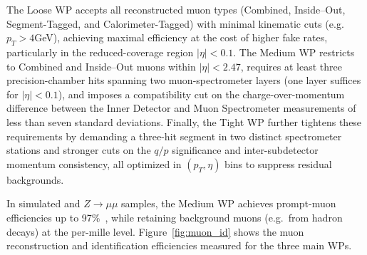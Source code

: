 The Loose WP accepts all reconstructed muon types (Combined, Inside–Out, Segment-Tagged, and Calorimeter-Tagged) with minimal kinematic cuts (e.g.\ $p_T>4$GeV), achieving maximal efficiency at the cost of higher fake rates, particularly in the reduced-coverage region $|\eta|<0.1$. The Medium WP restricts to Combined and Inside–Out muons within $|\eta|<2.47$, requires at least three precision-chamber hits spanning two muon-spectrometer layers (one layer suffices for $|\eta|<0.1$), and imposes a compatibility cut on the charge-over-momentum difference between the Inner Detector and Muon Spectrometer measurements of less than seven standard deviations. Finally, the Tight WP further tightens these requirements by demanding a three-hit segment in two distinct spectrometer stations and stronger cuts on the $q/p$ significance and inter-subdetector momentum consistency, all optimized in $(p_T,\eta)$ bins to suppress residual backgrounds.

In simulated \ttbar and $Z\to\mu\mu$ samples, the Medium WP achieves prompt-muon efficiencies up to 97$\%$~\cite{muon_reco_run2}, while retaining background muons (e.g.\ from hadron decays) at the per-mille level. Figure~\ref{fig:muon_id} shows the muon reconstruction and identification efficiencies measured for the three main WPs.

